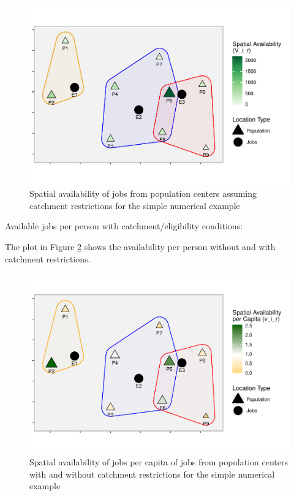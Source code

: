 \documentclass[]{elsarticle} %
\begin{document}
\begin{figure}
\includegraphics[width=1\linewidth]{Spatial-Availability_files/figure-latex/toy-example-availability-with-catchments-1} \caption{\label{fig:toy-example-availability-with-catchments}Spatial availability of jobs from population centers assuming catchment restrictions for the simple numerical example}\label{fig:toy-example-availability-with-catchments}
\end{figure}

Available jobs per person with catchment/eligibility conditions:

The plot in Figure
\ref{fig:toy-example-availability-with-catchments-per-capita} shows the
availability per person without and with catchment restrictions.

\begin{figure}
\includegraphics[width=1\linewidth]{Spatial-Availability_files/figure-latex/toy-example-availability-with-catchments-per-capita-1} \caption{\label{fig:toy-example-availability-with-catchments-per-capita}Spatial availability of jobs per capita of jobs from population centers with and without catchment restrictions for the simple numerical example}\label{fig:toy-example-availability-with-catchments-per-capita}
\end{figure}
\end{document}
